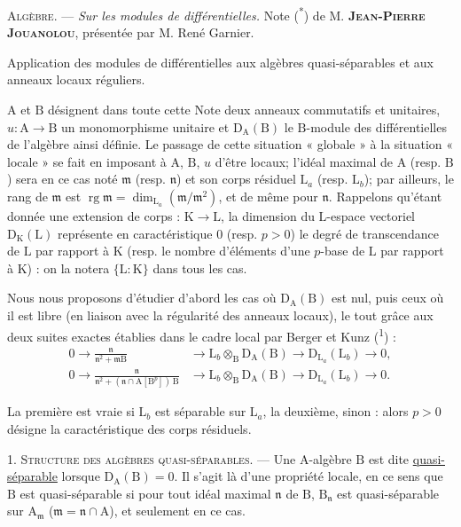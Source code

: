\textsc{Algèbre.} --- \textit{Sur les modules de différentielles.} Note (\textsuperscript{*}) de M. \textbf{\textsc{Jean-Pierre Jouanolou}}, présentée par M. René Garnier.

Application des modules de différentielles aux algèbres quasi-séparables et aux anneaux locaux réguliers.

$\mathrm A$ et $\mathrm B$ désignent dans toute cette Note deux anneaux commutatifs et unitaires, $u:\mathrm A\to\mathrm B$ un monomorphisme unitaire et $\mathrm D_{\mathrm A}(\mathrm B)$ le $\mathrm B$-module des différentielles de l’algèbre ainsi définie. Le passage de cette situation « globale » à la situation « locale » se fait en imposant à $\mathrm A$, $\mathrm B$, $u$ d’être locaux; l’idéal maximal de $\mathrm A$ (resp. $\mathrm B$) sera en ce cas noté $\mathfrak m$ (resp. $\mathfrak n$) et son corps résiduel $\mathrm L_a$ (resp. $\mathrm L_b$); par ailleurs, le rang de $\mathfrak m$ est $\operatorname{rg}\mathfrak m=\dim_{\mathrm L_a}(\mathfrak m/\mathfrak m^2)$, et de même pour $\mathfrak n$. Rappelons qu’étant donnée une extension de corps : $\mathrm K\to\mathrm L$, la dimension du $\mathrm L$-espace vectoriel $\mathrm D_{\mathrm K}(\mathrm L)$ représente en caractéristique $0$ (resp. $p>0$) le degré de transcendance de $\mathrm L$ par rapport à $\mathrm K$ (resp. le nombre d’éléments d’une $p$-base de $\mathrm L$ par rapport à $\mathrm K$) : on la notera $\{\mathrm L:\mathrm K\}$ dans tous les cas.

Nous nous proposons d’étudier d’abord les cas où $\mathrm D_{\mathrm A}(\mathrm B)$ est nul, puis ceux où il est libre (en liaison avec la régularité des anneaux locaux), le tout grâce aux deux suites exactes établies dans le cadre local par Berger et Kunz (\textsuperscript{1}) :
\[
\begin{aligned}
0\to\frac{\mathfrak n}{\mathfrak n^2+\mathfrak m\mathrm B}&\to\mathrm L_b\otimes_{\mathrm B}\mathrm D_{\mathrm A}(\mathrm B)\to\mathrm D_{\mathrm L_a}(\mathrm L_b)\to0,\\
0\to\frac{\mathfrak n}{\mathfrak n^2+(\mathfrak n\cap\mathrm A[\mathrm B^p])\,\mathrm B}&\to\mathrm L_b\otimes_{\mathrm B}\mathrm D_{\mathrm A}(\mathrm B)\to\mathrm D_{\mathrm L_a}(\mathrm L_b)\to0.
\end{aligned}
\]

La première est vraie si $\mathrm L_b$ est séparable sur $\mathrm L_a$, la deuxième, sinon : alors $p>0$ désigne la caractéristique des corps résiduels.

1. \textsc{Structure des algèbres quasi-séparables.} --- Une $\mathrm A$-algèbre $\mathrm B$ est dite \uline{quasi-séparable} lorsque $\mathrm D_{\mathrm A}(\mathrm B)=0$. Il s’agit là d’une propriété locale, en ce sens que $\mathrm B$ est quasi-séparable si pour tout idéal maximal $\mathfrak n$ de $\mathrm B$, $\mathrm B_{\mathfrak n}$ est quasi-séparable sur $\mathrm A_{\mathfrak m}$ ($\mathfrak m=\mathfrak n\cap\mathrm A$), et seulement en ce cas.

